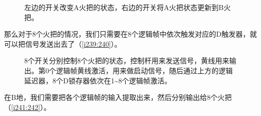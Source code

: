 \begin{figure}[!ht]
\begin{center}
\qquad
{}
\end{center}
\caption{左边的开关改变A火把的状态，右边的开关将A火把状态更新到B火把。}
\label{i237:238}
\end{figure}

那么对于8个火把的情况，我们只需要在8个逻辑帧中依次触发对应的D触发器，就可以把信号发送出去了（\autoref{i239:240}）。

\begin{figure}[!ht]
\begin{center}
\qquad
{}
\end{center}
\caption{8个开关分别控制8个火把的状态，控制杆用来发送信号，黄线用来输出。第0个逻辑帧黄线激活，用来做启动信号，随后通过上方的逻辑延迟器，8个D锁存器依次在1\~{}8个逻辑帧激活。}
\label{i239:240}
\end{figure}

在B地，我们需要把各个逻辑帧的输入提取出来，然后分别输出给8个火把（\autoref{i241:242}）。

